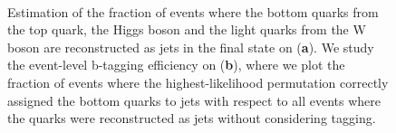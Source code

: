 \begin{figure}
\begin{centering}
\\
\caption[Fraction of events with correct matching to the hard process]{Estimation of the fraction of events where the bottom quarks from the top quark, the Higgs boson and the light quarks from the W boson are reconstructed as jets in the final state on (\textbf{a}). We study the event-level b-tagging efficiency on (\textbf{b}), where we plot the fraction of events where the highest-likelihood permutation correctly assigned the bottom quarks to jets with respect to all events where the quarks were reconstructed as jets without considering tagging.}
\label{fig:blr_matching}
\end{centering}
\end{figure}
 

